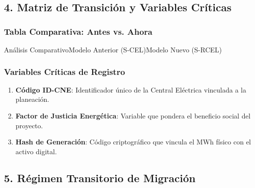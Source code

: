 \documentclass{cel}
\begin{document}
\subsection{4. Matriz de Transición y Variables Críticas}
\nopagebreak

\vspace{0.4cm}
\subsubsection{Tabla Comparativa: Antes vs. Ahora}
\nopagebreak

\vspace{0.3cm}
\begin{tablaParadigmaV2}{Análisis Comparativo}{Modelo Anterior (S-CEL)}{Modelo Nuevo (S-RCEL)}
\end{tablaParadigmaV2}

\subsubsection{Variables Críticas de Registro}
\nopagebreak

\begin{enumerate}
\item \textbf{Código ID-CNE}: Identificador único de la Central Eléctrica vinculada a la planeación.
\item \textbf{Factor de Justicia Energética}: Variable que pondera el beneficio social del proyecto.
\item \textbf{Hash de Generación}: Código criptográfico que vincula el MWh físico con el activo digital.


\end{enumerate}
\subsection{5. Régimen Transitorio de Migración}
\nopagebreak
\end{document}
